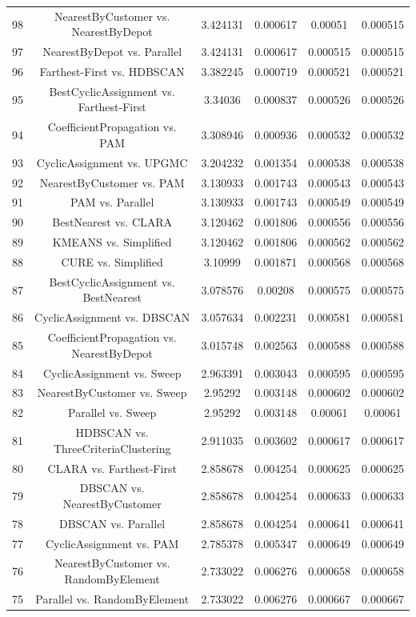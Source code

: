 \documentclass[a4paper,10pt]{article}
\begin{document}
\begin{landscape}
\begin{table}[!htp]
\begin{tabular}{cccccc}
98&NearestByCustomer vs. NearestByDepot&3.424131&0.000617&0.00051&0.000515\\
97&NearestByDepot vs. Parallel&3.424131&0.000617&0.000515&0.000515\\
96&Farthest-First vs. HDBSCAN&3.382245&0.000719&0.000521&0.000521\\
95&BestCyclicAssignment vs. Farthest-First&3.34036&0.000837&0.000526&0.000526\\
94&CoefficientPropagation vs. PAM&3.308946&0.000936&0.000532&0.000532\\
93&CyclicAssignment vs. UPGMC&3.204232&0.001354&0.000538&0.000538\\
92&NearestByCustomer vs. PAM&3.130933&0.001743&0.000543&0.000543\\
91&PAM vs. Parallel&3.130933&0.001743&0.000549&0.000549\\
90&BestNearest vs. CLARA&3.120462&0.001806&0.000556&0.000556\\
89&KMEANS vs. Simplified&3.120462&0.001806&0.000562&0.000562\\
88&CURE vs. Simplified&3.10999&0.001871&0.000568&0.000568\\
87&BestCyclicAssignment vs. BestNearest&3.078576&0.00208&0.000575&0.000575\\
86&CyclicAssignment vs. DBSCAN&3.057634&0.002231&0.000581&0.000581\\
85&CoefficientPropagation vs. NearestByDepot&3.015748&0.002563&0.000588&0.000588\\
84&CyclicAssignment vs. Sweep&2.963391&0.003043&0.000595&0.000595\\
83&NearestByCustomer vs. Sweep&2.95292&0.003148&0.000602&0.000602\\
82&Parallel vs. Sweep&2.95292&0.003148&0.00061&0.00061\\
81&HDBSCAN vs. ThreeCriteriaClustering&2.911035&0.003602&0.000617&0.000617\\
80&CLARA vs. Farthest-First&2.858678&0.004254&0.000625&0.000625\\
79&DBSCAN vs. NearestByCustomer&2.858678&0.004254&0.000633&0.000633\\
78&DBSCAN vs. Parallel&2.858678&0.004254&0.000641&0.000641\\
77&CyclicAssignment vs. PAM&2.785378&0.005347&0.000649&0.000649\\
76&NearestByCustomer vs. RandomByElement&2.733022&0.006276&0.000658&0.000658\\
75&Parallel vs. RandomByElement&2.733022&0.006276&0.000667&0.000667\\

\end{tabular}
\end{table}
\end{landscape}
\end{document}
